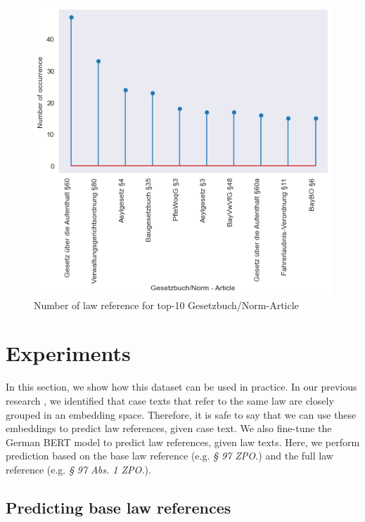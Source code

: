 \documentclass[sigconf]{acmart}
\begin{document}
\begin{figure}
    \centering
    \includegraphics[width=1.0\linewidth]{latex/gesetzbuch-art.png}
   \caption{Number of law reference for top-10 Gesetzbuch/Norm-Article}
   \label{fig:Gesetzbuch-art}
\end{figure}

\section{Experiments}
\label{sec:experiment}

In this section, we show how this dataset can be used in practice. In our previous research \cite{darji_mitrović_granitzer}, we identified that case texts that refer to the same law are closely grouped in an embedding space. Therefore, it is safe to say that we can use these embeddings to predict law references, given case text. We also fine-tune the German BERT model to predict law references, given law texts. Here, we perform prediction based on the base law reference (e.g. \textit{§ 97 ZPO.}) and the full law reference (e.g. \textit{§ 97 Abs. 1 ZPO.}).

\subsection{Predicting base law references}
\end{document}
